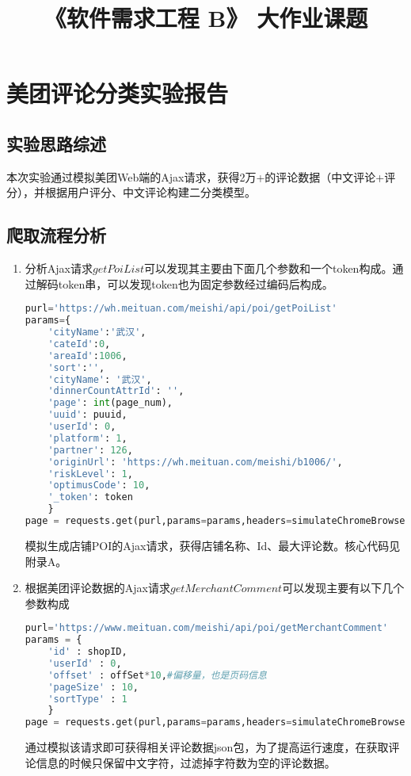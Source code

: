 \documentclass[withoutpreface,bwprint]{cumcmthesis} %
\title{《软件需求工程 B》 大作业课题}
\begin{document}
 
\newpage
\section{美团评论分类实验报告}

\subsection{实验思路综述}

本次实验通过模拟美团Web端的Ajax请求，获得2万+的评论数据（中文评论+评分），并根据用户评分、中文评论构建二分类模型。

\subsection{爬取流程分析}

\begin{enumerate}
\item 分析Ajax请求$getPoiList$可以发现其主要由下面几个参数和一个token构成。通过解码token串，可以发现token也为固定参数经过编码后构成。
\begin{lstlisting}[language=python]
purl='https://wh.meituan.com/meishi/api/poi/getPoiList'
params={
    'cityName':'武汉',
    'cateId':0,
    'areaId':1006,
    'sort':'',
    'cityName': '武汉',
    'dinnerCountAttrId': '',
    'page': int(page_num),
    'uuid': puuid,
    'userId': 0,
    'platform': 1,
    'partner': 126,
    'originUrl': 'https://wh.meituan.com/meishi/b1006/',
    'riskLevel': 1,
    'optimusCode': 10,
    '_token': token
    }
page = requests.get(purl,params=params,headers=simulateChromeBrowserData)
\end{lstlisting}

模拟生成店铺POI的Ajax请求，获得店铺名称、Id、最大评论数。核心代码见附录A。
\item 根据美团评论数据的Ajax请求$getMerchantComment$可以发现主要有以下几个参数构成
\begin{lstlisting}[language=python]
purl='https://www.meituan.com/meishi/api/poi/getMerchantComment'
params = {
    'id' : shopID,
    'userId' : 0,
    'offset' : offSet*10,#偏移量，也是页码信息
    'pageSize' : 10,
    'sortType' : 1
    }
page = requests.get(purl,params=params,headers=simulateChromeBrowserData)
\end{lstlisting}
通过模拟该请求即可获得相关评论数据json包，为了提高运行速度，在获取评论信息的时候只保留中文字符，过滤掉字符数为空的评论数据。
\end{enumerate}
\end{document}

